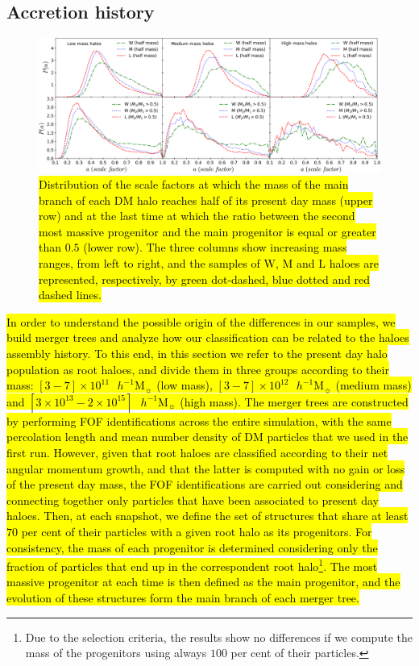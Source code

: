\documentclass[fleqn,usenatbib]{mnras}
\newcommand{\hMsun}{{\textrm{ $h^{-1}$M$_{\sun}$}}}
\newcommand{\Wh}{\mathrm{W}}
\newcommand{\Lh}{\mathrm{L}}
\newcommand{\Mh}{\mathrm{M}}
\begin{document}
\subsection{Accretion history}

\begin{figure}
	\includegraphics[width=2\columnwidth]{400Mpc_figs/acrecion_M123_adb.pdf}
    \caption{\hl{Distribution of the scale factors at which the mass of the main branch of each DM halo reaches half of its present day mass (upper row) and at the last time at which the ratio between the second most massive progenitor and the main progenitor is equal or greater than $0.5$  (lower row). The three columns show increasing mass ranges, from left to right, and the samples of $\Wh$, $\Mh$ and $\Lh$ haloes are represented, respectively, by green dot-dashed, blue dotted and red dashed lines.}}
    \label{fig:acrecion_M123}
\end{figure}

\hl{In order to understand the possible origin of the differences in our samples, we build merger trees and analyze how our classification can be related to the haloes assembly history. To this end, in this section we refer to the present day halo population as root haloes, and divide them in three groups according to their mass: $[3 - 7]\times10^{11}\hMsun$ (low mass), $[3 - 7]\times10^{12}\hMsun$ (medium mass) and $[3\times10^{13} - 2\times10^{15}]\hMsun$ (high mass). 
The merger trees are constructed by performing FOF identifications across the entire simulation, with the same percolation length and mean number density of DM particles that we used in the first run.
However, given that root haloes are classified according to their net angular momentum growth, and that the latter is computed with no gain or loss of the present day mass, the FOF identifications are carried out considering and connecting together only particles that have been associated to present day haloes. Then, at each snapshot, we define the set of structures that share at least $70$ per cent of their particles with a given root halo as its progenitors. For consistency, the mass of each progenitor is determined considering only the fraction of particles that end up in the correspondent root halo\footnote{Due to the selection criteria, the results show no differences if we compute the mass of the progenitors using always $100$ per cent of their particles.}. The most massive progenitor at each time is then defined as the main progenitor, and the evolution of these structures form the main branch of each merger tree.}
\end{document}
